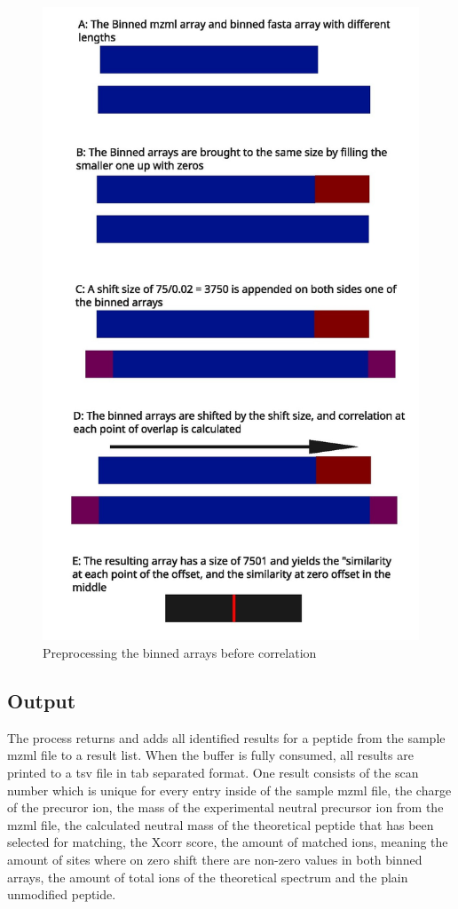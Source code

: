 \documentclass[11pt]{article}
\begin{document}
\begin{figure}
\includegraphics[width=\linewidth]{figs/crosscorr.jpg} 
\caption{Preprocessing the binned arrays before correlation}
\label{fig:corr}
\end{figure}

\subsection{Output}
The process returns and adds all identified results for a peptide from the sample mzml file to a result list. When the buffer is fully consumed, all results are printed to a tsv file in tab separated format. One result consists of the scan number which is unique for every entry inside of the sample mzml file, the charge of the precuror ion, the mass of the experimental neutral precursor ion from the mzml file, the calculated neutral mass of the theoretical peptide that has been selected for matching, the Xcorr score, the amount of matched ions, meaning the amount of sites where on zero shift there are non-zero values in both binned arrays, the amount of total ions of the theoretical spectrum and the plain unmodified peptide.
\end{document}
